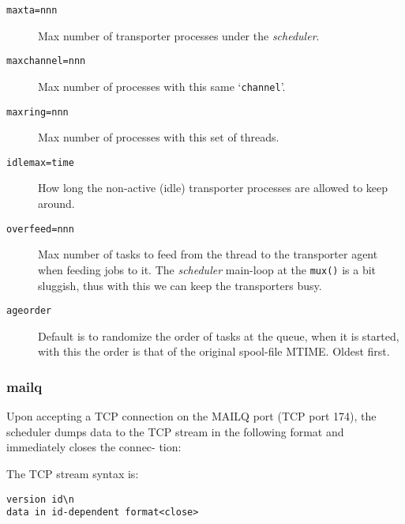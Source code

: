 \begin{description}
\item[{\tt maxta=nnn}] \mbox{}

Max number of transporter processes under 
the {\em scheduler\/}. 

\item[{\tt maxchannel=nnn}] \mbox{}

Max number of processes with this same 
`{\tt channel}'. 

\item[{\tt maxring=nnn}] \mbox{}

Max number of processes with this set of 
threads. 

\item[{\tt idlemax=time}] \mbox{}

How long the non-active (idle) transporter 
processes are allowed to keep around. 

\item[{\tt overfeed=nnn}] \mbox{}

Max number of tasks to feed from the 
thread to the transporter agent when feeding jobs to it. The 
{\em scheduler\/} main-loop at the {\tt mux()} is a bit sluggish, 
thus with this we can keep the transporters busy. 

\item[{\tt ageorder}] \mbox{}

Default is to randomize the order of tasks 
at the queue, when it is started, with this the order is that of 
the original spool-file MTIME. Oldest first. 

\end{description}







\subsubsection{mailq}



Upon  accepting a  TCP  connection on the MAILQ port (TCP
port 174), the scheduler dumps data to the TCP  stream  in
the  following  format  and immediately closes the connec-
tion:

The TCP stream syntax is:
\begin{tscreen}
\begin{verbatim}
version id\n
data in id-dependent format<close>
\end{verbatim}
\end{tscreen}



